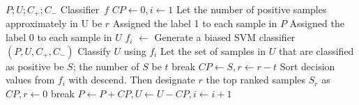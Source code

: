 \documentclass{article}
\begin{document}
\begin{algorithm}[!h]
\renewcommand{\algorithmicrequire}{\textbf{Input:}} %
\renewcommand{\algorithmicensure}{\textbf{Output:}} %
	\caption{EB-SVM} %
	\begin{algorithmic}[1] %
	    \REQUIRE
	    $P;U;C_+;C_-$
	    \ENSURE
	    Classifier\ $f$
	    \STATE $CP\leftarrow 0, i\leftarrow 1$
	    \STATE Let the number of positive samples approximately in U be $r$
		\STATE Assigned the label 1 to each sample in $P$
		\STATE Assigned the label 0 to each sample in $U$
		\STATE $f_i$ $\leftarrow$ Generate a biased SVM classifier$(P,U,C_+,C_-)$
		\STATE Classify $U$ using $f_i$
		\STATE Let the set of samples in $U$ that are classified as positive be $S$; the number of $S$ be $t$
		\STATE break
		\STATE $CP\leftarrow S, r\leftarrow r-t$
		\STATE Sort decision values from $f_i$ with descend. Then designate $r$ the top ranked samples $S_r$ as $CP, r\leftarrow 0$
		\ELSE
		\STATE break
		\ENDIF
		\STATE $P\leftarrow P+CP, U\leftarrow U-CP, i\leftarrow i+1$
		\ENDWHILE
	\end{algorithmic}
\end{algorithm}
\end{document}
